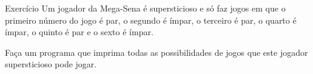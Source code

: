 \documentclass[handout]{beamer}
\begin{document}
\begin{frame}[fragile]{Exercício}
    Um jogador da Mega-Sena é supersticioso e só faz jogos em que o primeiro número do jogo é par, o segundo é ímpar, o terceiro é par, o quarto é ímpar, o quinto é par e o sexto é ímpar.
    
    Faça um programa que imprima todas as possibilidades de jogos que este jogador supersticioso pode jogar.
\end{frame}
\end{document}
